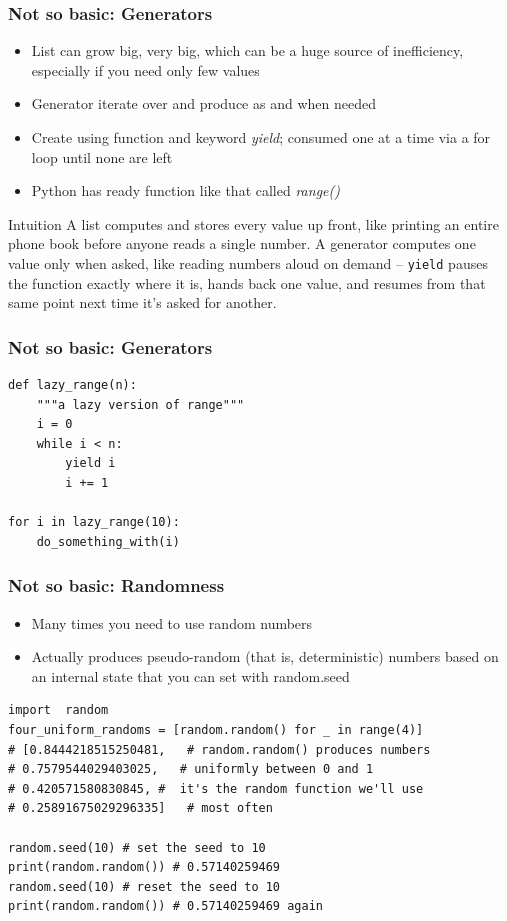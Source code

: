 \begin{frame}[fragile]\frametitle{Not so basic: Generators}
  \begin{itemize}
  \item List can grow big, very big, which can be a huge source of inefficiency, especially if you need only few values
  \item Generator iterate over and produce as and when needed
  \item Create using function and keyword {\em yield}; consumed one at a time via a for loop until none are left
  \item Python has ready function like that called {\em range()}
  \end{itemize}
\begin{block}{Intuition}
A list computes and stores every value up front, like printing an entire phone book before anyone reads a single number. A generator computes one value only when asked, like reading numbers aloud on demand -- \lstinline{yield} pauses the function exactly where it is, hands back one value, and resumes from that same point next time it's asked for another.
\end{block}
\end{frame}

\begin{frame}[fragile]\frametitle{Not so basic: Generators}
  \begin{lstlisting}
def lazy_range(n):
    """a lazy version of range"""
    i = 0
    while i < n:
        yield i
        i += 1

for i in lazy_range(10):
	do_something_with(i)
  \end{lstlisting}
\end{frame}

\begin{frame}[fragile]\frametitle{Not so basic: Randomness}
  \begin{itemize}
  \item Many times you need to use random numbers
  \item Actually produces pseudo-random	(that is, deterministic) numbers based on an internal state that you can set with random.seed
  \end{itemize}
  \begin{lstlisting}
import	random
four_uniform_randoms = [random.random() for _ in range(4)]
# [0.8444218515250481,	 # random.random() produces numbers
# 0.7579544029403025,	# uniformly between 0 and 1
# 0.420571580830845, #	it's the random function we'll use
# 0.25891675029296335]	 # most often

random.seed(10) # set the seed to 10
print(random.random()) # 0.57140259469
random.seed(10) # reset the seed to 10
print(random.random()) # 0.57140259469 again
  \end{lstlisting}
\end{frame}



